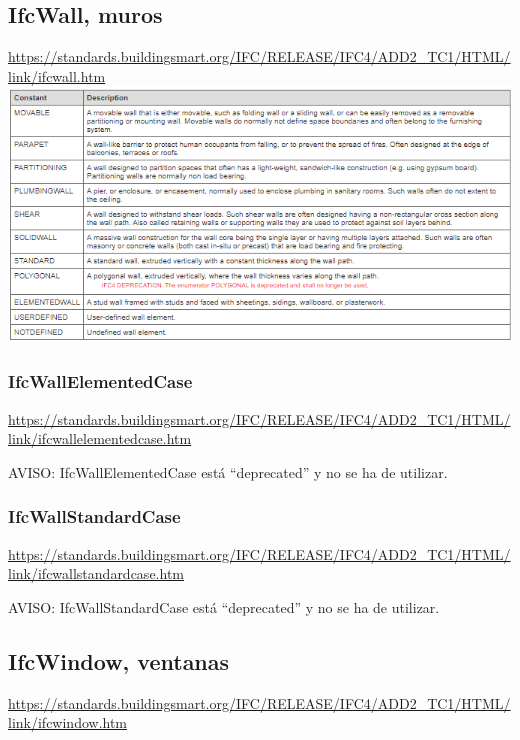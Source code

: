 \documentclass[spanish,12pt,a4paper,final,oneside]{book}
\begin{document}
\subsection{IfcWall, muros}
\url{https://standards.buildingsmart.org/IFC/RELEASE/IFC4/ADD2_TC1/HTML/link/ifcwall.htm}
\\ \includegraphics[width=\textwidth]{Definicion de IfcWallTypeEnum}

\subsubsection{IfcWallElementedCase}
\url{https://standards.buildingsmart.org/IFC/RELEASE/IFC4/ADD2_TC1/HTML/link/ifcwallelementedcase.htm}

AVISO: IfcWallElementedCase está ``deprecated'' y no se ha de utilizar.

\subsubsection{IfcWallStandardCase}
\url{https://standards.buildingsmart.org/IFC/RELEASE/IFC4/ADD2_TC1/HTML/link/ifcwallstandardcase.htm}

AVISO: IfcWallStandardCase está ``deprecated'' y no se ha de utilizar.


\subsection{IfcWindow, ventanas}
\url{https://standards.buildingsmart.org/IFC/RELEASE/IFC4/ADD2_TC1/HTML/link/ifcwindow.htm}
\end{document}
